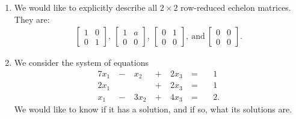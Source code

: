 \documentclass[12pt]{article}
\begin{document}
\begin{enumerate}
  \item
    We would like to explicitly describe all $2 \times 2$
    row-reduced echelon matrices. They are:
    \begin{align*}
      \begin{bmatrix}
        1 & 0\\
        0 & 1
      \end{bmatrix},\ 
      \begin{bmatrix}
        1 & a\\
        0 & 0
      \end{bmatrix},\ 
      \begin{bmatrix}
        0 & 1\\
        0 & 0
      \end{bmatrix},\ \text{and}\ 
      \begin{bmatrix}
        0 & 0\\
        0 & 0
      \end{bmatrix}.
    \end{align*}

  \item
    We consider the system of equations
    \begin{alignat*}{7}
      x_1\ &-&\ x_2\ &+&\ 2x_3\ &=&\ &1\\
      2x_1\ &&\ \ &+&\ 2x_3\ &=&\ &1\\
      x_1\ &-&\ 3x_2\ &+&\ 4x_3\ &=&\ &2.
    \end{alignat*}
    We would like to know if it has a solution, and if so, what
    its solutions are.


\end{enumerate}
\end{document}
